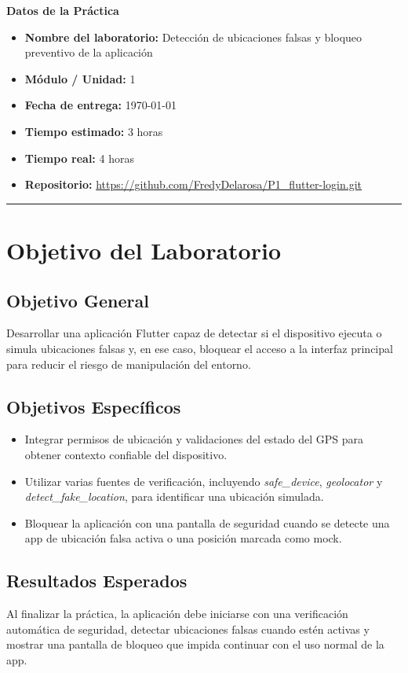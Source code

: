 \documentclass[12pt, a4paper]{article}
\newcommand{\corte}{1}
\newcommand{\actividad}{Detección de ubicaciones falsas y bloqueo preventivo de la aplicación}
\newcommand{\fechaentrega}{\today}
\begin{document}
\vspace{8pt}
\textbf{Datos de la Práctica}
\begin{itemize}[noitemsep, topsep=4pt]
    \item \textbf{Nombre del laboratorio:} \actividad
    \item \textbf{Módulo / Unidad:} \corte
    \item \textbf{Fecha de entrega:} \fechaentrega
    \item \textbf{Tiempo estimado:} 3 horas
    \item \textbf{Tiempo real:} 4 horas
    \item \textbf{Repositorio:} \url{https://github.com/FredyDelarosa/P1_flutter-login.git}
\end{itemize}

\vspace{10pt}
\hrule
\vspace{10pt}

\section{Objetivo del Laboratorio}

\subsection*{Objetivo General}
Desarrollar una aplicación Flutter capaz de detectar si el dispositivo ejecuta o simula ubicaciones falsas y, en ese caso, bloquear el acceso a la interfaz principal para reducir el riesgo de manipulación del entorno.

\subsection*{Objetivos Específicos}
\begin{itemize}[topsep=4pt]
    \item Integrar permisos de ubicación y validaciones del estado del GPS para obtener contexto confiable del dispositivo.
    \item Utilizar varias fuentes de verificación, incluyendo \textit{safe\_device}, \textit{geolocator} y \textit{detect\_fake\_location}, para identificar una ubicación simulada.
    \item Bloquear la aplicación con una pantalla de seguridad cuando se detecte una app de ubicación falsa activa o una posición marcada como mock.
\end{itemize}

\subsection*{Resultados Esperados}
Al finalizar la práctica, la aplicación debe iniciarse con una verificación automática de seguridad, detectar ubicaciones falsas cuando estén activas y mostrar una pantalla de bloqueo que impida continuar con el uso normal de la app.
\end{document}
